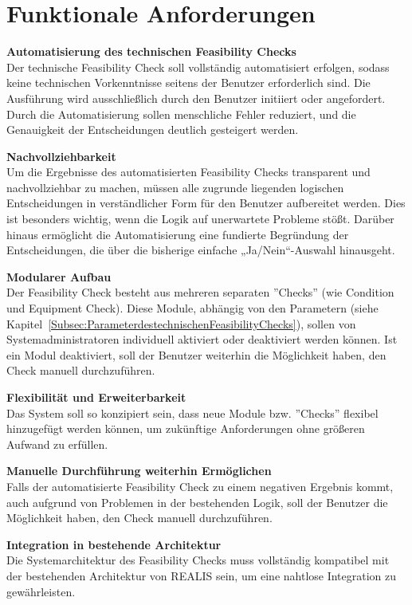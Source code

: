 \section{Funktionale Anforderungen} \label{Sec:funktionale-anforderungen}

\setlength{\leftskip}{1em} 
\textbf{Automatisierung des technischen Feasibility Checks}  \\
Der technische Feasibility Check soll vollständig automatisiert erfolgen, sodass keine technischen Vorkenntnisse seitens der Benutzer erforderlich sind. Die Ausführung wird ausschließlich durch den Benutzer initiiert oder angefordert. Durch die Automatisierung sollen menschliche Fehler reduziert, und die Genauigkeit der Entscheidungen deutlich gesteigert werden.

\textbf{Nachvollziehbarkeit}  \\
Um die Ergebnisse des automatisierten Feasibility Checks transparent und nachvollziehbar zu machen, müssen alle zugrunde liegenden logischen Entscheidungen in verständlicher Form für den Benutzer aufbereitet werden. Dies ist besonders wichtig, wenn die Logik auf unerwartete Probleme stößt. Darüber hinaus ermöglicht die Automatisierung eine fundierte Begründung der Entscheidungen, die über die bisherige einfache „Ja/Nein“-Auswahl hinausgeht.

\textbf{Modularer Aufbau}  \\
Der Feasibility Check besteht aus mehreren separaten ''Checks'' (wie Condition und Equipment Check). Diese Module, abhängig von den Parametern (siehe Kapitel~\ref{Subsec:ParameterdestechnischenFeasibilityChecks}), sollen von Systemadministratoren individuell aktiviert oder deaktiviert werden können. Ist ein Modul deaktiviert, soll der Benutzer weiterhin die Möglichkeit haben, den Check manuell durchzuführen.

\textbf{Flexibilität und Erweiterbarkeit}  \\
Das System soll so konzipiert sein, dass neue Module bzw. ''Checks'' flexibel hinzugefügt werden können, um zukünftige Anforderungen ohne größeren Aufwand zu erfüllen.

\textbf{Manuelle Durchführung weiterhin Ermöglichen}  \\
Falls der automatisierte Feasibility Check zu einem negativen Ergebnis kommt, auch aufgrund von Problemen in der bestehenden Logik, soll der Benutzer die Möglichkeit haben, den Check manuell durchzuführen.

\textbf{Integration in bestehende Architektur}  \\
Die Systemarchitektur des Feasibility Checks muss vollständig kompatibel mit der bestehenden Architektur von \gls{REALIS} sein, um eine nahtlose Integration zu gewährleisten.

\setlength{\leftskip}{0em} 
